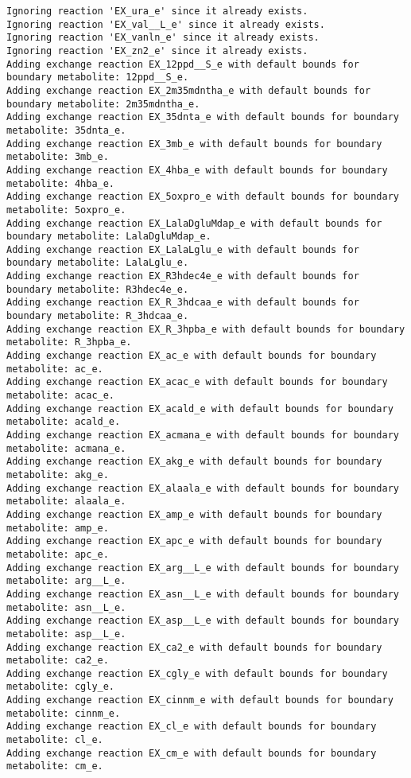 \documentclass[
  letterpaper,
  DIV=11,
  numbers=noendperiod]{scrartcl}
\begin{document}
\begin{verbatim}
Ignoring reaction 'EX_ura_e' since it already exists.
Ignoring reaction 'EX_val__L_e' since it already exists.
Ignoring reaction 'EX_vanln_e' since it already exists.
Ignoring reaction 'EX_zn2_e' since it already exists.
Adding exchange reaction EX_12ppd__S_e with default bounds for boundary metabolite: 12ppd__S_e.
Adding exchange reaction EX_2m35mdntha_e with default bounds for boundary metabolite: 2m35mdntha_e.
Adding exchange reaction EX_35dnta_e with default bounds for boundary metabolite: 35dnta_e.
Adding exchange reaction EX_3mb_e with default bounds for boundary metabolite: 3mb_e.
Adding exchange reaction EX_4hba_e with default bounds for boundary metabolite: 4hba_e.
Adding exchange reaction EX_5oxpro_e with default bounds for boundary metabolite: 5oxpro_e.
Adding exchange reaction EX_LalaDgluMdap_e with default bounds for boundary metabolite: LalaDgluMdap_e.
Adding exchange reaction EX_LalaLglu_e with default bounds for boundary metabolite: LalaLglu_e.
Adding exchange reaction EX_R3hdec4e_e with default bounds for boundary metabolite: R3hdec4e_e.
Adding exchange reaction EX_R_3hdcaa_e with default bounds for boundary metabolite: R_3hdcaa_e.
Adding exchange reaction EX_R_3hpba_e with default bounds for boundary metabolite: R_3hpba_e.
Adding exchange reaction EX_ac_e with default bounds for boundary metabolite: ac_e.
Adding exchange reaction EX_acac_e with default bounds for boundary metabolite: acac_e.
Adding exchange reaction EX_acald_e with default bounds for boundary metabolite: acald_e.
Adding exchange reaction EX_acmana_e with default bounds for boundary metabolite: acmana_e.
Adding exchange reaction EX_akg_e with default bounds for boundary metabolite: akg_e.
Adding exchange reaction EX_alaala_e with default bounds for boundary metabolite: alaala_e.
Adding exchange reaction EX_amp_e with default bounds for boundary metabolite: amp_e.
Adding exchange reaction EX_apc_e with default bounds for boundary metabolite: apc_e.
Adding exchange reaction EX_arg__L_e with default bounds for boundary metabolite: arg__L_e.
Adding exchange reaction EX_asn__L_e with default bounds for boundary metabolite: asn__L_e.
Adding exchange reaction EX_asp__L_e with default bounds for boundary metabolite: asp__L_e.
Adding exchange reaction EX_ca2_e with default bounds for boundary metabolite: ca2_e.
Adding exchange reaction EX_cgly_e with default bounds for boundary metabolite: cgly_e.
Adding exchange reaction EX_cinnm_e with default bounds for boundary metabolite: cinnm_e.
Adding exchange reaction EX_cl_e with default bounds for boundary metabolite: cl_e.
Adding exchange reaction EX_cm_e with default bounds for boundary metabolite: cm_e.

\end{verbatim}
\end{document}
